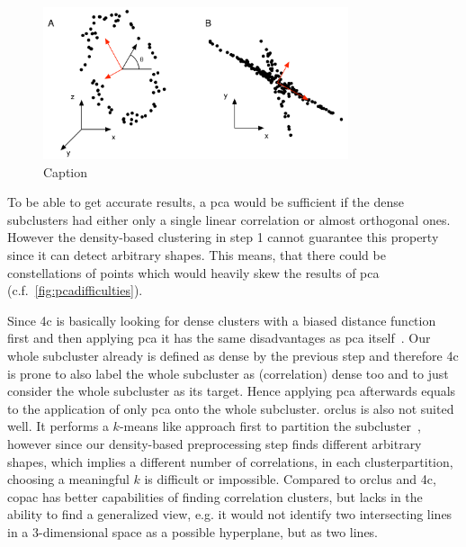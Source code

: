 \begin{figure}
    \centering
    \includegraphics[width=0.8\textwidth]{figures/PCAdifficulties.png}
    \caption{Caption\cite{PCAshlens2014tutorial}}
    \label{fig:pcadifficulties}
\end{figure}

To be able to get accurate results, a \gls{pca} would be sufficient if the dense subclusters had either only a single linear correlation or almost orthogonal ones. However the density-based clustering in step 1 cannot guarantee this property since it can detect arbitrary shapes. This means, that there could be constellations of points which would heavily skew the results of \gls{pca} (c.f.~\autoref{fig:pcadifficulties})\cite{PCAshlens2014tutorial}. 

Since \gls{4c} is basically looking for dense clusters with a biased distance function first and then applying \gls{pca} it has the same disadvantages as \gls{pca} itself~\cite{4cbohm2004computing}. Our whole subcluster already is defined as dense by the previous step and therefore \gls{4c} is prone to also label the whole subcluster as (correlation) dense too and to just consider the whole subcluster as its target. Hence applying \gls{pca} afterwards equals to the application of only \gls{pca} onto the whole subcluster. 
\gls{orclus} is also not suited well. It performs a $k$-means like approach first to partition the subcluster~\cite{orclusaggarwal2000finding}, however since our density-based preprocessing step finds different arbitrary shapes, which implies a different number of correlations, in each clusterpartition, choosing a meaningful $k$ is difficult or impossible. 
Compared to \gls{orclus} and \gls{4c}, \gls{copac} has better capabilities of finding correlation clusters, but lacks in the ability to find a generalized view, e.g. it would not identify two intersecting lines in a 3-dimensional space as a possible hyperplane, but as two lines. 


